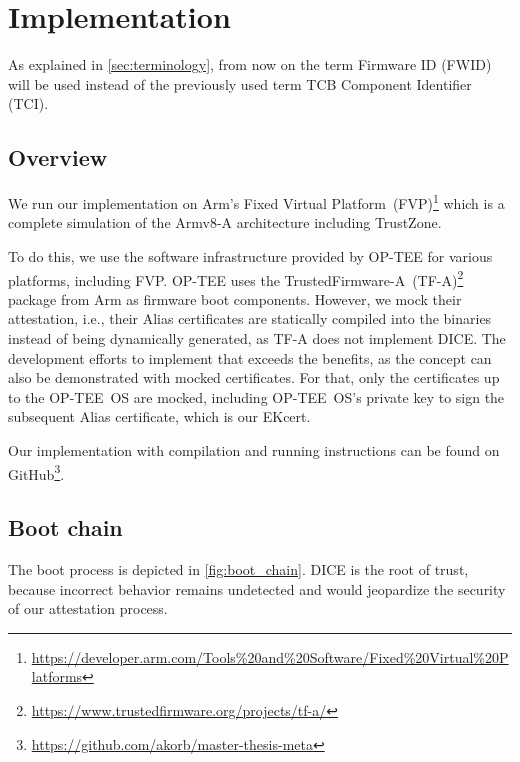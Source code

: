 
\chapter{Implementation}\label{chapter:implementation}

As explained in \autoref{sec:terminology}, from now on the term Firmware ID (FWID) will be used instead of the previously used term TCB Component Identifier (TCI).

\section{Overview}


We run our implementation on Arm's Fixed Virtual Platform~(FVP)\footnote{\url{https://developer.arm.com/Tools\%20and\%20Software/Fixed\%20Virtual\%20Platforms}} which is a complete simulation of the Armv8-A architecture including TrustZone.

To do this, we use the software infrastructure provided by OP-TEE for various platforms, including FVP\@.
OP-TEE uses the TrustedFirmware-A~(TF-A)\footnote{\url{https://www.trustedfirmware.org/projects/tf-a/}} package from Arm as firmware boot components.
However, we mock their attestation, i.e., their Alias certificates are statically compiled into the binaries instead of being dynamically generated, as TF-A does not implement DICE\@.
The development efforts to implement that exceeds the benefits, as the concept can also be demonstrated with mocked certificates.
For that, only the certificates up to the OP-TEE~OS are mocked, including OP-TEE~OS's private key to sign the subsequent Alias certificate, which is our EKcert.

Our implementation with compilation and running instructions can be found on GitHub\footnote{\url{https://github.com/akorb/master-thesis-meta}}.

\section{Boot chain}

The boot process is depicted in \autoref{fig:boot_chain}.
DICE is the root of trust, because incorrect behavior remains undetected and would jeopardize the security of our attestation process.




